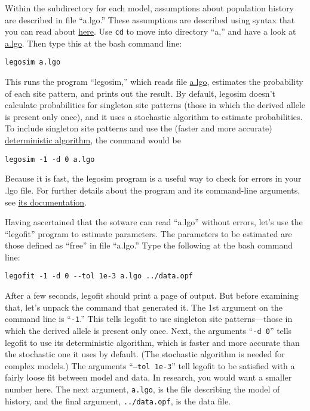 \documentclass[11pt]{article}
\begin{document}
Within the subdirectory for each model, assumptions about population
history are described in file ``a.lgo.''  These assumptions are
described using syntax that you can read about
\href{http://alanrogers.github.io/legofit/html/index.html#lgo}{here}.
Use \texttt{cd} to move into directory ``a,'' and have a look at
\href{https://github.com/alanrogers/agar22/tree/main/legofit/europe/a/a.lgo}{a.lgo}. Then
type this at the bash command line:
\begin{verbatim}
legosim a.lgo
\end{verbatim}
This runs the program ``legosim,'' which reads file
\href{https://github.com/alanrogers/agar22/tree/main/legofit/europe/a/a.lgo}{a.lgo},
estimates the probability of each site pattern, and prints out the
result. By default, legosim doesn't calculate probabilities for
singleton site patterns (those in which the derived allele is present
only once), and it uses a stochastic algorithm to estimate
probabilities. To include singleton site patterns and use the (faster
and more accurate)
\href{https://peercommunityjournal.org/articles/10.24072/pcjournal.132}{deterministic
  algorithm}, the command would be
\begin{verbatim}
legosim -1 -d 0 a.lgo
\end{verbatim}
Because it is fast, the legosim program is a useful way to check for
errors in your .lgo file. For further details about the program and
its command-line arguments, see
\href{http://alanrogers.github.io/legofit/html/legosim.html}{its
  documentation}.

Having ascertained that the sotware can read ``a.lgo'' without errors,
let's use the ``legofit'' program to estimate parameters. The
parameters to be estimated are those defined as ``free'' in file
``a.lgo.'' Type the following at the bash command line:
\begin{verbatim}
legofit -1 -d 0 --tol 1e-3 a.lgo ../data.opf
\end{verbatim}
After a few seconds, legofit should print a page of output. But before
examining that, let's unpack the command that generated it. The 1st
argument on the command line is ``\texttt{-1}.'' This tells legofit to
use singleton site patterns---those in which the derived allele is
present only once. Next, the arguments ``\texttt{-d 0}'' tells legofit
to use its deterministic algorithm, which is faster and more accurate
than the stochastic one it uses by default. (The stochastic algorithm
is needed for complex models.) The arguments ``\texttt{--tol 1e-3}''
tell legofit to be satisfied with a fairly loose fit between model and
data. In research, you would want a smaller number here. The next
argument, \texttt{a.lgo}, is the file describing the model of history,
and the final argument, \texttt{../data.opf}, is the data file.
\end{document}

